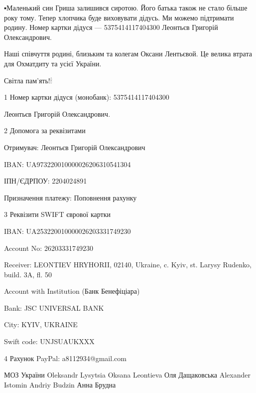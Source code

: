 ▪️Маленький син Гриша залишився сиротою. Його батька також не стало більше року
тому. Тепер хлопчика буде виховувати дідусь. Ми можемо підтримати родину. Номер
картки дідуся — 5375414117404300 Леонтьєв Григорій Олександрович.

Наші співчуття родині, близьким та колегам Оксани Лентьєвой. Це велика втрата
для Охматдиту та усієї України.

Світла пам'ять!🕯

1 Номер картки дідуся (монобанк): 5375414117404300 

Леонтьєв Григорій Олександрович.

2 Допомога за реквізитами

Отримувач: Леонтьєв Григорій Олександрович \par
IBAN: UA973220010000026206310541304 \par
ІПН/ЄДРПОУ: 2204024891 \par
Призначення платежу: Поповнення рахунку\par
3 Реквізити SWIFT єврової картки\par
IBAN: UA253220010000026203331749230 \par
Account No: 26203331749230 \par
Receiver: LEONTIEV HRYHORII, 02140, Ukraine, c. Kyiv, st. Larysy Rudenko, build. 3A, fl. 50 \par
Account with Institution (Банк Бенефіціара)\par
Bank: JSC UNIVERSAL BANK \par
City: KYIV, UKRAINE \par
Swift code: UNJSUAUKXXX\par
4 Рахунок PayPal: a8112934@gmail.com\par

МОЗ України Oleksandr Lysytsia Oksana Leontieva Оля Дащаковська Alexander
Istomin Andriy  Budzin Анна Брудна

